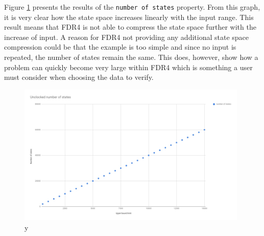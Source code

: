 Figure \ref{fig:unclocked_states} presents the results of the \texttt{number of states} property. From this graph, it is very clear how the state space increases linearly with the input range. This result means that FDR4 is not able to compress the state space further with the increase of input. A reason for FDR4 not providing any additional state space compression could be that the example is too simple and since no input is repeated, the number of states remain the same. This does, however, show how a problem can quickly become very large within FDR4 which is something a user must consider when choosing the data to verify.
\begin{figure}
    \includegraphics[width=0.98\textwidth]{./figures/15-11-2018/unclocked_number_of_states.jpg}
\caption{y}
\label{fig:unclocked_states}
\end{figure}

